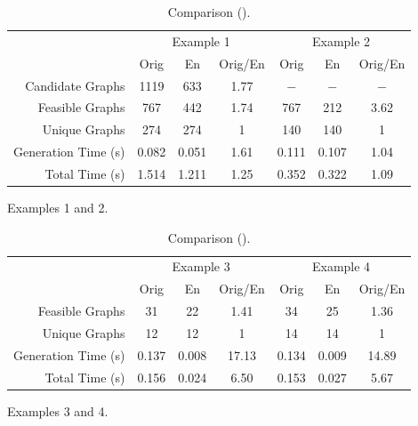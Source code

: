 \begin{table}[ht]
    \centering
    \begin{subfigure}[b]{\textwidth}
        \centering
        \caption{Examples 1 and 2.}
		\begin{tabular}{r | c | c | c | c | c | c}
		\hline \hline
		& \multicolumn{3}{c|}{Example 1} & \multicolumn{3}{c}{Example 2} \\
		& Orig & En & Orig/En & Orig & En & Orig/En \\
		\hline
		Candidate Graphs & 1119 & 633 & 1.77 & $-$ & $-$ & $-$ \\
		Feasible Graphs & 767 & 442 &  1.74 & 767 & 212 & 3.62 \\ 
		Unique Graphs & 274 & 274 & 1 & 140 & 140 & 1 \\
		Generation Time (s) & 0.082 & 0.051 & 1.61 & 0.111  & 0.107 & 1.04 \\
		Total Time (s) & 1.514 & 1.211 & 1.25 & 0.352 & 0.322 & 1.09 \\
		\hline \hline
		\end{tabular}
    \end{subfigure}

	\vspace{1ex}

    \begin{subfigure}[b]{\textwidth}
        \centering
        \caption{Examples 3 and 4.}
		\begin{tabular}{r | c | c | c | c | c | c}
		\hline \hline
		& \multicolumn{3}{c|}{Example 3} & \multicolumn{3}{c}{Example 4} \\
		& Orig & En & Orig/En & Orig & En & Orig/En \\
		\hline
		Feasible Graphs & 31 & 22 & 1.41 & 34 & 25 & 1.36 \\ 
		Unique Graphs & 12 & 12 & 1 & 14 & 14 & 1 \\
		Generation Time (s) & 0.137 & 0.008 & 17.13 & 0.134 & 0.009 & 14.89 \\
		Total Time (s) & 0.156 & 0.024 & 6.50 & 0.153 & 0.027 & 5.67 \\
		\hline \hline
		\end{tabular}
    \end{subfigure}

	\caption{Comparison ().\label{fig:app1:case-study-2}}

\end{table}

